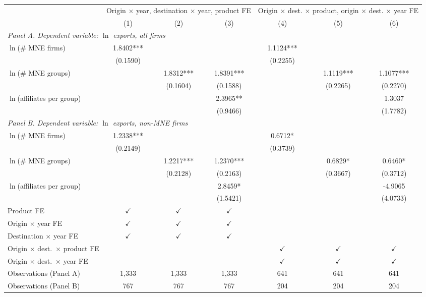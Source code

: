 \begin{tabular}{lcccccc} \hline
 & \multicolumn{3}{c}{Origin $\times$ year, destination $\times$ year, product FE} & \multicolumn{3}{c}{Origin $\times$ dest. $\times$ product, origin $\times$ dest. $\times$ year FE} \\
 & (1) & (2) & (3) & (4) & (5) & (6) \\ \hline
\multicolumn{7}{l}{\textit{Panel A. Dependent variable: $\ln$ exports, all firms}} \\
$\ln$(\# MNE firms) & 1.8402*** &  &  & 1.1124*** &  &  \\
 & (0.1590) &  &  & (0.2255) &  &  \\
$\ln$(\# MNE groups) &  & 1.8312*** & 1.8391*** &  & 1.1119*** & 1.1077*** \\
 &  & (0.1604) & (0.1588) &  & (0.2265) & (0.2270) \\
$\ln$(affiliates per group) &  &  & 2.3965** &  &  & 1.3037 \\
 &  &  & (0.9466) &  &  & (1.7782) \\
\midrule
\multicolumn{7}{l}{\textit{Panel B. Dependent variable: $\ln$ exports, non-MNE firms}} \\
$\ln$(\# MNE firms) & 1.2338*** &  &  & 0.6712* &  &  \\
 & (0.2149) &  &  & (0.3739) &  &  \\
$\ln$(\# MNE groups) &  & 1.2217*** & 1.2370*** &  & 0.6829* & 0.6460* \\
 &  & (0.2128) & (0.2163) &  & (0.3667) & (0.3712) \\
$\ln$(affiliates per group) &  &  & 2.8459* &  &  & -4.9065 \\
 &  &  & (1.5421) &  &  & (4.0733) \\
\hline
Product FE & $\checkmark$ & $\checkmark$ & $\checkmark$ &  &  &  \\
Origin $\times$ year FE & $\checkmark$ & $\checkmark$ & $\checkmark$ &  &  &  \\
Destination $\times$ year FE & $\checkmark$ & $\checkmark$ & $\checkmark$ &  &  &  \\
Origin $\times$ dest.\ $\times$ product FE &  &  &  & $\checkmark$ & $\checkmark$ & $\checkmark$ \\
Origin $\times$ dest.\ $\times$ year FE &  &  &  & $\checkmark$ & $\checkmark$ & $\checkmark$ \\
Observations (Panel A) & 1,333 & 1,333 & 1,333 & 641 & 641 & 641 \\
Observations (Panel B) & 767 & 767 & 767 & 204 & 204 & 204 \\
\hline
\end{tabular}
